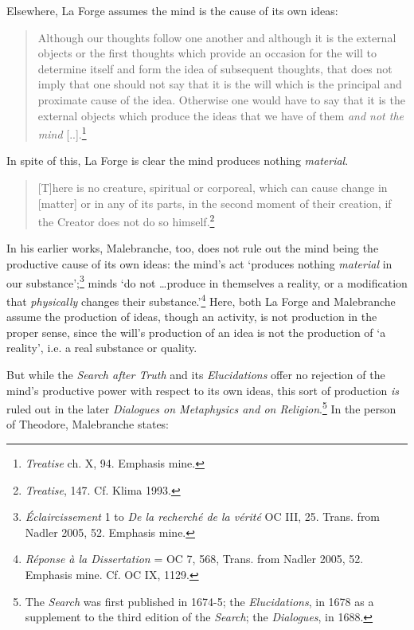 \documentclass{article}
\begin{document}
Elsewhere, La Forge assumes the mind is the cause of its own ideas:

\begin{quote}
Although our thoughts follow one another and although it is the external
objects or the first thoughts which provide an occasion for the will to
determine itself and form the idea of subsequent thoughts, that does not
imply that one should not say that it is the will which is the principal
and proximate cause of the idea. Otherwise one would have to say that it
is the external objects which produce the ideas that we have of them
\emph{and not the mind} {[}..{]}.\footnote{\emph{Treatise} ch. X, 94.
  Emphasis mine.}
\end{quote}

In spite of this, La Forge is clear the mind produces nothing
\emph{material}.

\begin{quote}
{[}T{]}here is no creature, spiritual or corporeal, which can cause
change in {[}matter{]} or in any of its parts, in the second moment of
their creation, if the Creator does not do so himself.\footnote{\emph{Treatise},
  147. Cf. Klima 1993.}
\end{quote}

In his earlier works, Malebranche, too, does not rule out the mind being
the productive cause of its own ideas: the mind's act `produces nothing
\emph{material} in our substance';\footnote{\emph{Éclaircissement} 1 to
  \emph{De la recherché de la vérité} OC III, 25. Trans. from Nadler
  2005, 52. Emphasis mine.} minds `do not \ldots produce in
themselves a reality, or a modification that \emph{physically} changes
their substance.'\footnote{\emph{Réponse à la Dissertation} = OC 7, 568,
  Trans. from Nadler 2005, 52. Emphasis mine. Cf. OC IX, 1129.} Here,
both La Forge and Malebranche assume the production of ideas, though an
activity, is not production in the proper sense, since the will's
production of an idea is not the production of `a reality', i.e. a real
substance or quality.

But while the \emph{Search after Truth} and its \emph{Elucidations}
offer no rejection of the mind's productive power with respect to its
own ideas, this sort of production \emph{is} ruled out in the later
\emph{Dialogues on Metaphysics and on Religion}.\footnote{The
  \emph{Search} was first published in 1674-5; the \emph{Elucidations},
  in 1678 as a supplement to the third edition of the \emph{Search}; the
  \emph{Dialogues}, in 1688.} In the person of Theodore, Malebranche
states:
\end{document}
